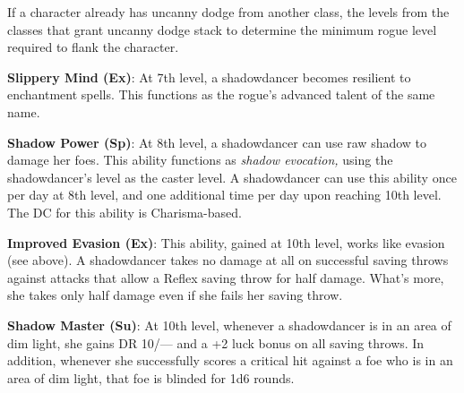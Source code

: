 If a character already has uncanny dodge from another class, the levels from the classes that grant uncanny dodge stack to determine the minimum rogue level required to flank the character.
				
\textbf{Slippery Mind (Ex)}: At 7th level, a shadowdancer becomes resilient to enchantment spells. This functions as the rogue's advanced talent of the same name.
				
\textbf{Shadow Power (Sp)}: At 8th level, a shadowdancer can use raw shadow to damage her foes. This ability functions as \textit{shadow evocation,} using the shadowdancer's level as the caster level. A shadowdancer can use this ability once per day at 8th level, and one additional time per day upon reaching 10th level. The DC for this ability is Charisma-based. 
				
\textbf{Improved Evasion (Ex)}: This ability, gained at 10th level, works like evasion (see above). A shadowdancer takes no damage at all on successful saving throws against attacks that allow a Reflex saving throw for half damage. What's more, she takes only half damage even if she fails her saving throw.
				
\textbf{Shadow Master (Su)}: At 10th level, whenever a shadowdancer is in an area of dim light, she gains DR 10/--- and a +2 luck bonus on all saving throws. In addition, whenever she successfully scores a critical hit against a foe who is in an area of dim light, that foe is blinded for 1d6 rounds.
        	
